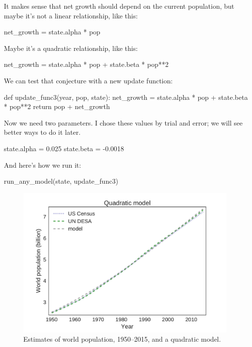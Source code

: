\documentclass[12pt]{book}
\theoremstyle{exercise}
\begin{document}
It makes sense that net growth should depend on the current population, but maybe it's not a linear relationship, like this:

\begin{python}
    net_growth = state.alpha * pop
\end{python}

Maybe it's a quadratic relationship, like this:

\begin{python}
    net_growth = state.alpha * pop + state.beta * pop**2
\end{python}

We can test that conjecture with a new update function:

\begin{python}
def update_func3(year, pop, state):
    net_growth = state.alpha * pop + state.beta * pop**2
    return pop + net_growth
\end{python}

Now we need two parameters.  I chose these values by trial and error; we will see better ways to do it later.

\begin{python}
state.alpha = 0.025
state.beta = -0.0018
\end{python}

And here's how we run it:

\begin{python}
run_any_model(state, update_func3)
\end{python}

\begin{figure}
\centerline{\includegraphics[height=3in]{figs/chap03-fig04.pdf}}
\caption{Estimates of world population, 1950--2015, and a quadratic model.}
\label{chap03-fig04}
\end{figure}
\end{document}
